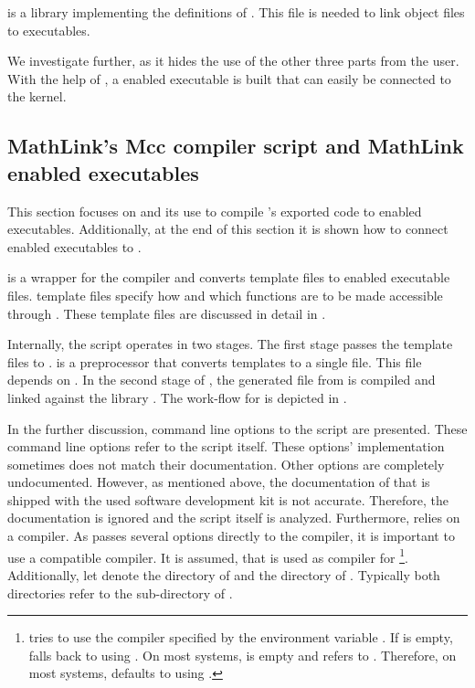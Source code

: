  is a library implementing the definitions of . This file is needed to link object files to executables.

We investigate \Mcc further, as it hides the use of the other three parts from the user. With the help of \Mcc, a \MathLink enabled executable is built that can easily be connected to the \Mathematica kernel.

\subsection{MathLink's Mcc compiler script and MathLink enabled executables}

This section focuses on \Mcc and its use to compile \Aldor's exported \C code to \MathLink enabled executables. Additionally, at the end of this section it is shown how to connect \MathLink enabled executables to \Mathematica.

\Mcc is a wrapper for the \C compiler and converts \MathLink template files to \MathLink enabled executable files. \MathLink template files specify how and which \C functions are to be made accessible through \MathLink. These template files are discussed in detail in .

Internally, the \Mcc script operates in two stages. The first stage passes the \MathLink template files to \Mprep. \Mprep is a preprocessor that converts \MathLink templates to a single \C file. This \C file depends on . In the second stage of \Mcc, the generated \C file from \Mprep is compiled and linked against the library . The work-flow for \Mcc is depicted in .


In the further discussion, command line options to the \Mcc script are presented. These command line options refer to the script itself. These options' implementation sometimes does not match their documentation. Other options are completely undocumented. However, as mentioned above, the documentation of \Mcc that is shipped with the used software development kit is not accurate. Therefore, the documentation is ignored and the script itself is analyzed. Furthermore, \Mcc relies on a \C compiler. As \Mcc passes several options directly to the \C compiler, it is important to use a compatible \C compiler. It is assumed, that \Gcc is used as \C compiler for \Mcc{}\footnote{\Mcc tries to use the \C compiler specified by the environment variable . If  is empty, \Mcc falls back to using . On most \GNULinux systems,  is empty and  refers to \Gcc. Therefore, on most \GNULinux systems, \Mcc defaults to using \Gcc.}. Additionally, let  denote the directory of  and  the directory of . Typically both directories refer to the  sub-directory of \Mathematica. 


